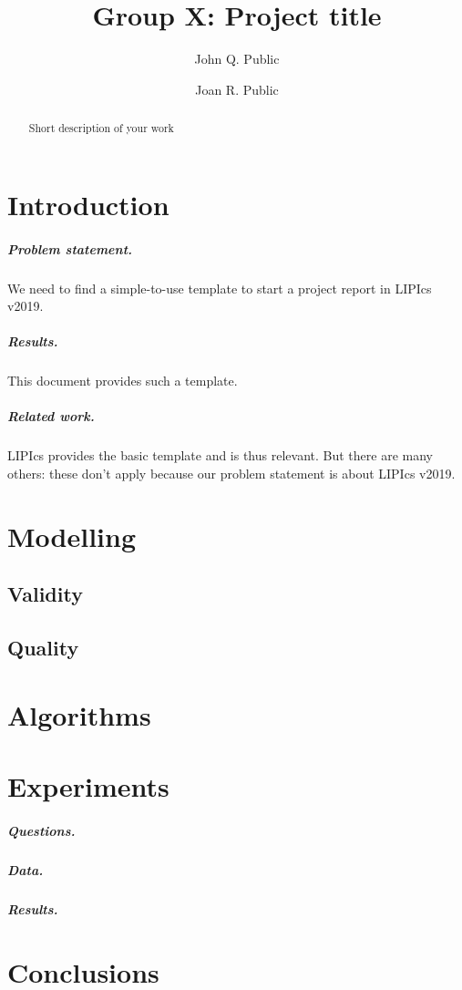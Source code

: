 \documentclass[a4paper,UKenglish,cleveref, autoref]{lipics-v2019}
\title{Group X: Project title} %
\author{John Q. Public}{<STUDENT NR> }{<EMAIL ADDRESS>}{}{}
\author{Joan R. Public}{<STUDENT NR> }{<EMAIL ADDRESS>}{}{}
\begin{document}
\maketitle

\begin{abstract}
Short description of your work
\end{abstract}

\section{Introduction}
\label{sec:intro}

\subparagraph{Problem statement.}
We need to find a simple-to-use template to start a project report in  LIPIcs v2019.

\subparagraph{Results.}
This document provides such a template.

\subparagraph{Related work.}
LIPIcs provides the basic template and is thus relevant. But there are many others: these don't apply because our problem statement is about LIPIcs v2019.

\section{Modelling}
\label{sec:model}

\subsection{Validity}
\label{ssec:validity}

\subsection{Quality}
\label{ssec:quality}

\section{Algorithms}
\label{sec:algorithms}

\section{Experiments}
\label{sec:exp}

\subparagraph{Questions.}

\subparagraph{Data.}

\subparagraph{Results.}

\section{Conclusions}
\end{document}
